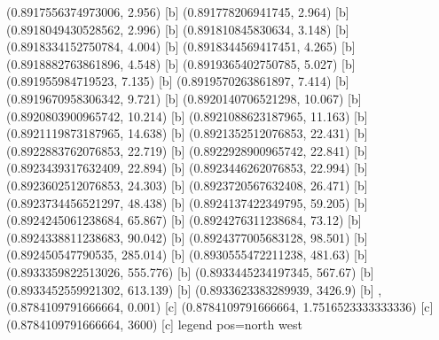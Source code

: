 {{{(0.8917556374973006, 2.956) [b] 
(0.891778206941745, 2.964) [b] 
(0.8918049430528562, 2.996) [b] 
(0.891810845830634, 3.148) [b] 
(0.8918334152750784, 4.004) [b] 
(0.8918344569417451, 4.265) [b] 
(0.8918882763861896, 4.548) [b] 
(0.8919365402750785, 5.027) [b] 
(0.891955984719523, 7.135) [b] 
(0.8919570263861897, 7.414) [b] 
(0.8919670958306342, 9.721) [b] 
(0.8920140706521298, 10.067) [b] 
(0.8920803900965742, 10.214) [b] 
(0.8921088623187965, 11.163) [b] 
(0.8921119873187965, 14.638) [b] 
(0.8921352512076853, 22.431) [b] 
(0.8922883762076853, 22.719) [b] 
(0.8922928900965742, 22.841) [b] 
(0.8923439317632409, 22.894) [b] 
(0.8923446262076853, 22.994) [b] 
(0.8923602512076853, 24.303) [b] 
(0.8923720567632408, 26.471) [b] 
(0.8923734456521297, 48.438) [b] 
(0.8924137422349795, 59.205) [b] 
(0.8924245061238684, 65.867) [b] 
(0.8924276311238684, 73.12) [b] 
(0.8924338811238683, 90.042) [b] 
(0.8924377005683128, 98.501) [b] 
(0.892450547790535, 285.014) [b] 
(0.8930555472211238, 481.63) [b] 
(0.8933359822513026, 555.776) [b] 
(0.8933445234197345, 567.67) [b] 
(0.8933452559921302, 613.139) [b] 
(0.8933623383289939, 3426.9) [b] 
},{(0.8784109791666664, 0.001) [c] 
(0.8784109791666664, 1.7516523333333336) [c] 
(0.8784109791666664, 3600) [c] 
}}}{legend pos=north west}